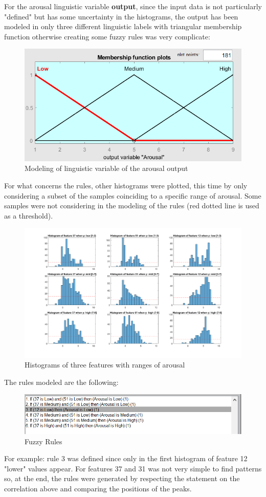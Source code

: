 For the arousal linguistic variable \textbf{output}, since the input data is not particularly "defined" but has some uncertainty in the histograms, the output has been modeled in only three different linguistic labels with triangular membership function otherwise creating some fuzzy rules was very complicate:
 \begin{figure}[H]
 	\centering
 	\includegraphics[width=0.5\linewidth]{img/lin_var_arousal.png}
 	\caption{Modeling of linguistic variable of the arousal output}
 \end{figure}
For what concerns the rules, other histograms were plotted, this time by only considering a subset of the samples coinciding to a specific range of arousal. Some samples were not considering in the modeling of the rules (red dotted line is used as a threshold).

\begin{figure}[H]
	\centering
	\includegraphics[width=\linewidth]{img/histogram_top_3_features_specific.png}
	\caption{Histograms of three features with ranges of arousal}
\end{figure}
The rules modeled are the following:
\begin{figure}[H]
	\centering
	\includegraphics[width=\linewidth]{img/rules.png}
	\caption{Fuzzy Rules}
\end{figure}
For example: rule 3 was defined since only in the first histogram of feature 12 "lower" values appear. For features 37 and 31 was not very simple to find patterns so, at the end, the rules were generated by respecting the statement on the correlation above and comparing the positions of the peaks.  

